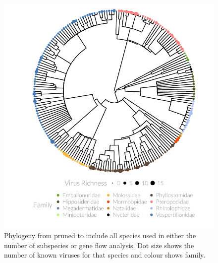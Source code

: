 \begin{knitrout}\footnotesize
{}\color{fgcolor}\begin{figure}[t]

{\centering \includegraphics[width=1\textwidth,trim = 0cm 0cm 0cm 0cm]{figure/treePlot-1} 

}

\caption[Pruned phylogeny with dot size showing number of pathogens and colour showing family.]{
Phylogeny from \cite{bininda2007delayed} pruned to include all species used in either the number of subspecies or gene flow analysis.
Dot size shows the number of known viruses for that species and colour shows family.
}\label{fig:treePlot}
\end{figure}


\end{knitrout}





